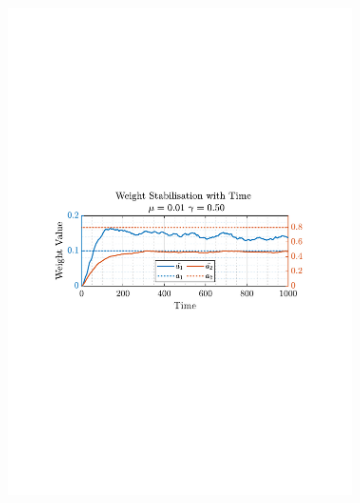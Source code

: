 \documentclass[12pt]{article}
\begin{document}
\begin{figure}[H]
\begin{subfigure}{0.49\textwidth}
					\includegraphics[trim={2.2cm 11.2cm 3.00cm  11.2cm}, clip, width=\textwidth]{../MATLAB/figures/q2_1f_fig05.pdf} 
					\captionsetup{justification=centering}
				\end{subfigure}
			

\end{figure}
\end{document}
